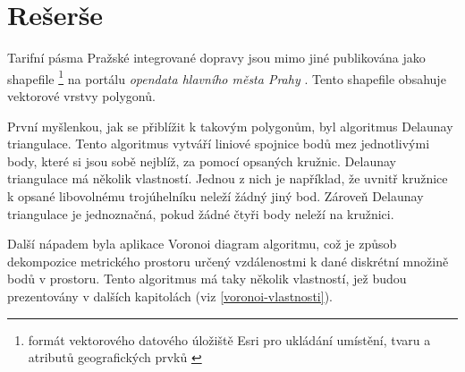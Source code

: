 \chapter{Rešerše}
\label{0-reserse}

Tarifní pásma Pražské integrované dopravy jsou mimo jiné publikována jako shapefile 
\footnote{formát vektorového datového úložiště Esri pro ukládání umístění,
tvaru a atributů geografických prvků \cite{shapefile}}
na portálu \textit{opendata hlavního města Prahy} \cite{opendata}. Tento shapefile
obsahuje vektorové vrstvy polygonů.

První myšlenkou, jak se přiblížit k takovým polygonům, byl algoritmus Delaunay triangulace.
Tento algoritmus vytváří liniové spojnice bodů mez jednotlivými body, které si jsou sobě nejblíž,
za pomocí opsaných kružnic. Delaunay triangulace má několik vlastností. Jednou z nich je například,
že uvnitř kružnice k opsané libovolnému trojúhelníku neleží žádný jiný bod.
Zároveň Delaunay triangulace je jednoznačná, pokud žádné čtyři body neleží na kružnici. \cite{bayer-delaunay}

Další nápadem byla aplikace Voronoi diagram algoritmu, což je způsob dekompozice 
metrického prostoru určený vzdálenostmi k dané diskrétní množině bodů v prostoru.
Tento algoritmus má taky několik vlastností, jež budou prezentovány v dalších kapitolách 
(viz \ref{voronoi-vlastnosti}). 